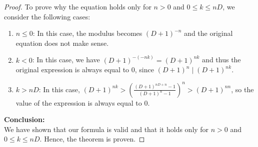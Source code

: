 \documentclass{article}
\theoremstyle{plain}
\begin{document}
\begin{proof}
To prove why the equation holds only for $n > 0$ and $0 \leq k \leq nD$, we consider the following cases:
\begin{enumerate}
\item $n \leq 0$: In this case, the modulus becomes $(D+1)^{-n}$ and the original equation does not make sense.
\item $k < 0$: In this case, we have $(D+1)^{-(-nk)} = (D+1)^{nk}$ and thus the original expression is always equal to $0$, since $(D+1)^{n} \mid (D+1)^{nk}$.
\item $k > nD$: In this case, $(D+1)^{nk} > \left(\frac{(D + 1)^{n D + n} - 1}{(D + 1)^{n} - 1}\right)^{n} > (D+1)^{nn}$, so the value of the expression is always equal to $0$.
\end{enumerate}
\noindent
\textbf{Conclusion:}
\\
We have shown that our formula is valid and that it holds only for $n > 0$ and $0 \leq k \leq nD$. Hence, the theorem is proven.
\end{proof}
\end{document}
